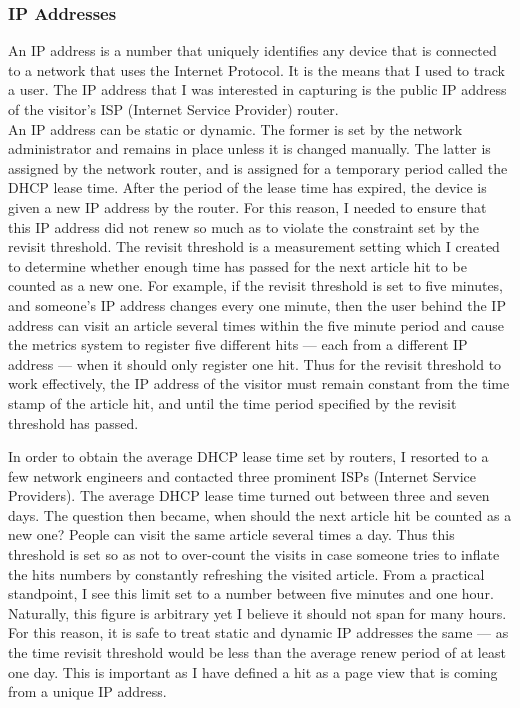 \documentclass[12pt]{article}
\begin{document}
\subsubsection{IP Addresses}
An IP address is a number that uniquely identifies any device that is connected to a network that uses the Internet Protocol. It is the means that I used to track a user. The IP address that I was interested in capturing is the public IP address of the visitor's ISP (Internet Service Provider) router. \\
An IP address can be static or dynamic. The former is set by the network administrator and remains in place unless it is changed manually. The latter is assigned by the network router, and is assigned for a temporary period called the DHCP lease time. After the period of the lease time has expired, the device is given a new IP address by the router. For this reason, I needed to ensure that this IP address did not renew so much as to violate the constraint set by the revisit threshold. The revisit threshold is a measurement setting which I created to determine whether enough time has passed for the next article hit to be counted as a new one. For example, if the revisit threshold is set to five minutes, and someone's IP address changes every one minute, then the user behind the IP address can visit an article several times within the five minute period and cause the metrics system to register five different hits --- each from a different IP address --- when it should only register one hit. Thus for the revisit threshold to work effectively, the IP address of the visitor must remain constant from the time stamp of the article hit, and until the time period specified by the revisit threshold has passed. 

In order to obtain the average DHCP lease time set by routers, I resorted to a few network engineers and contacted three prominent ISPs (Internet Service Providers). The average DHCP lease time turned out between three and seven days. The question then became, when should the next article hit be counted as a new one? People can visit the same article several times a day. Thus this threshold is set so as not to over-count the visits in case someone tries to inflate the hits numbers by constantly refreshing the visited article. From a practical standpoint, I see this limit set to a number between five minutes and one hour. Naturally, this figure is arbitrary yet I believe it should not span for many hours. For this reason, it is safe to treat static and dynamic IP addresses the same --- as the time revisit threshold would be less than the average renew period of at least one day. This is important as I have defined a hit as a page view that is coming from a unique IP address.
\end{document}
